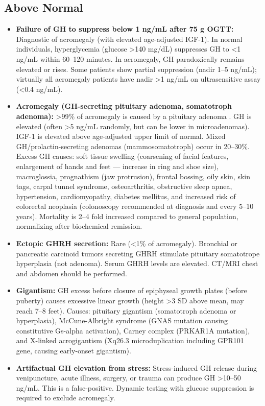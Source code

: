 \subsection*{Above Normal}
\begin{itemize}
  \item \textbf{Failure of GH to suppress below 1 ng/mL after 75 g OGTT:} Diagnostic of acromegaly (with elevated age-adjusted IGF-1). In normal individuals, hyperglycemia (glucose >140 mg/dL) suppresses GH to <1 ng/mL within 60--120 minutes. In acromegaly, GH paradoxically remains elevated or rises. Some patients show partial suppression (nadir 1--5 ng/mL); virtually all acromegaly patients have nadir >1 ng/mL on ultrasensitive assay (<0.4 ng/mL).
  \item \textbf{Acromegaly (GH-secreting pituitary adenoma, somatotroph adenoma):} >99\% of acromegaly is caused by a pituitary adenoma \cite{melmed2009acromegaly}. GH is elevated (often >5 ng/mL randomly, but can be lower in microadenomas). IGF-1 is elevated above age-adjusted upper limit of normal. Mixed GH/prolactin-secreting adenomas (mammosomatotroph) occur in 20--30\%. Excess GH causes: soft tissue swelling (coarsening of facial features, enlargement of hands and feet --- increase in ring and shoe size), macroglossia, prognathism (jaw protrusion), frontal bossing, oily skin, skin tags, carpal tunnel syndrome, osteoarthritis, obstructive sleep apnea, hypertension, cardiomyopathy, diabetes mellitus, and increased risk of colorectal neoplasia (colonoscopy recommended at diagnosis and every 5--10 years). Mortality is 2--4 fold increased compared to general population, normalizing after biochemical remission.
  \item \textbf{Ectopic GHRH secretion:} Rare (<1\% of acromegaly). Bronchial or pancreatic carcinoid tumors secreting GHRH stimulate pituitary somatotrope hyperplasia (not adenoma). Serum GHRH levels are elevated. CT/MRI chest and abdomen should be performed.
  \item \textbf{Gigantism:} GH excess before closure of epiphyseal growth plates (before puberty) causes excessive linear growth (height >3 SD above mean, may reach 7--8 feet). Causes: pituitary gigantism (somatotroph adenoma or hyperplasia), McCune-Albright syndrome (GNAS mutation causing constitutive Gs-alpha activation), Carney complex (PRKAR1A mutation), and X-linked acrogigantism (Xq26.3 microduplication including GPR101 gene, causing early-onset gigantism).
  \item \textbf{Artifactual GH elevation from stress:} Stress-induced GH release during venipuncture, acute illness, surgery, or trauma can produce GH >10--50 ng/mL. This is a false-positive. Dynamic testing with glucose suppression is required to exclude acromegaly.

\end{itemize}
